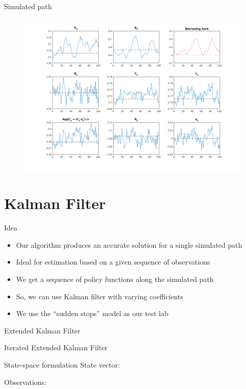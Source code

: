 \documentclass{beamer}
\begin{document}
\begin{frame}{Simulated path}

    \begin{figure}[htpb]
        \centering
        \includegraphics[width=1.0\linewidth]{sudden_stops_path}
        \label{fig:sudden_stops_path}
    \end{figure}
    
\end{frame}

\section{Kalman Filter}

\begin{frame}{Idea}
    \begin{itemize}
        \item Our algorithm produces an accurate solution for a single simulated path
            \bigskip
        \item Ideal for estimation based on a given sequence of observations
            \bigskip
        \item We get a sequence of policy functions along the simulated path
            \bigskip
        \item So, we can use Kalman filter with varying coefficients
            \bigskip
        \item We use the ``sudden stops'' model as our test lab
    \end{itemize}
\end{frame}

\begin{frame}{Extended Kalman Filter}
    
\end{frame}

\begin{frame}{Iterated Extended Kalman Filter}
    
\end{frame}

\begin{frame}{State-space formulation}
    State vector:
    \begin{itemize}
        
    \end{itemize}
    
    \bigskip
    Observations:
\end{frame}
\end{document}
